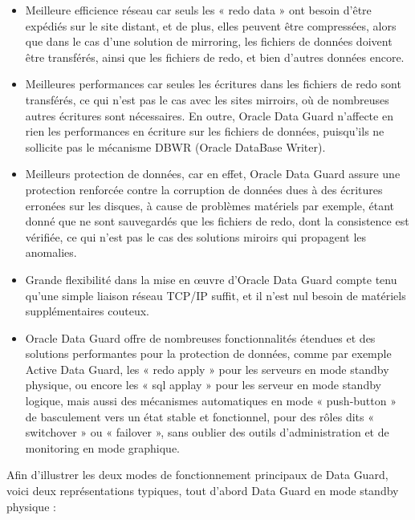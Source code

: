 \documentclass[12pt]{report}
\begin{document}
\begin{itemize}
\item Meilleure efficience réseau car seuls les « redo data » ont besoin d'être
expédiés sur le site distant, et de plus, elles peuvent être compressées, alors
que dans le cas d'une solution de mirroring, les fichiers de données doivent
être transférés, ainsi que les fichiers de redo, et bien d'autres données
encore.

\item Meilleures performances car seules les écritures dans les fichiers de redo sont
transférés, ce qui n'est pas le cas avec les sites mirroirs, où de nombreuses
autres écritures sont nécessaires. En outre, Oracle Data Guard n'affecte en rien
les performances en écriture sur les fichiers de données, puisqu'ils ne
sollicite pas le mécanisme DBWR (Oracle DataBase Writer).

\item Meilleurs protection de données, car en effet, Oracle Data Guard assure une
protection renforcée contre la corruption de données dues à des écritures
erronées sur les disques, à cause de problèmes matériels par exemple, étant
donné que ne sont sauvegardés que les fichiers de redo, dont la consistence est
vérifiée, ce qui n'est pas le cas des solutions miroirs qui propagent les
anomalies.

\item Grande flexibilité dans la mise en œuvre d'Oracle Data Guard compte tenu qu'une
simple liaison réseau TCP/IP suffit, et il n'est nul besoin de matériels
supplémentaires couteux.

\item Oracle Data Guard offre de nombreuses fonctionnalités étendues et des solutions
performantes pour la protection de données, comme par exemple Active Data Guard,
les « redo apply » pour les serveurs en mode standby physique, ou encore les
« sql applay » pour les serveur en mode standby logique, mais aussi des
mécanismes automatiques en mode « push-button » de basculement vers un état
stable et fonctionnel, pour des rôles dits « switchover » ou « failover », sans
oublier des outils d'administration et de monitoring en mode graphique.
\end{itemize}

\vspace{1cm}

Afin d'illustrer les deux modes de fonctionnement principaux de Data Guard,
voici deux représentations typiques, tout d'abord Data Guard en mode standby
physique : \\
\end{document}
